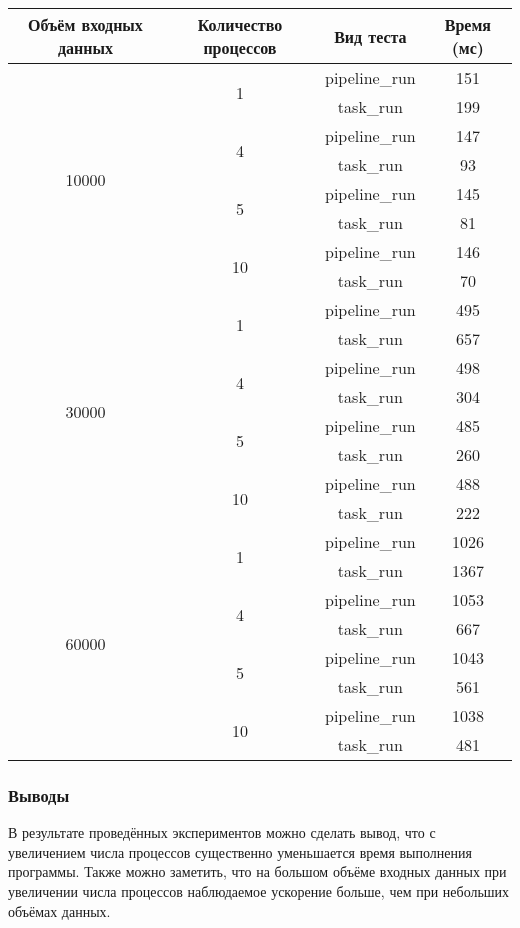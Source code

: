 \documentclass[a4paper,12pt]{article}
\begin{document}
\begin{table}[h]

\begin{tabular}{|c|c|c|c|}
	\hline
	\textbf{Объём входных данных} & \textbf{Количество процессов} & \textbf{Вид теста} & \textbf{Время (мс)} \\
	\hline
	\multirow{8}{*}{10000} & \multirow{2}{*}{1} & pipeline\_run & 151 \\
	& & task\_run & 199 \\
	\cline{2-4}
	& \multirow{2}{*}{4} & pipeline\_run & 147 \\
	& & task\_run & 93  \\
	\cline{2-4}
	& \multirow{2}{*}{5} & pipeline\_run & 145 \\
	& & task\_run & 81 \\
	\cline{2-4}
	& \multirow{2}{*}{10} & pipeline\_run & 146 \\
	& & task\_run & 70  \\
	\hline
	\multirow{8}{*}{30000} & \multirow{2}{*}{1} & pipeline\_run & 495 \\
	& & task\_run & 657 \\
	\cline{2-4}
	& \multirow{2}{*}{4} & pipeline\_run & 498 \\
	& & task\_run & 304  \\
	\cline{2-4}
	& \multirow{2}{*}{5} & pipeline\_run & 485 \\
	& & task\_run & 260 \\
	\cline{2-4}
	& \multirow{2}{*}{10} & pipeline\_run & 488 \\
	& & task\_run & 222  \\
	\hline
	\multirow{8}{*}{60000} & \multirow{2}{*}{1} & pipeline\_run & 1026 \\
	& & task\_run & 1367 \\
	\cline{2-4}
	& \multirow{2}{*}{4} & pipeline\_run & 1053 \\
	& & task\_run & 667  \\
	\cline{2-4}
	& \multirow{2}{*}{5} & pipeline\_run & 1043 \\
	& & task\_run & 561 \\
	\cline{2-4}
	& \multirow{2}{*}{10} & pipeline\_run & 1038 \\
	& & task\_run & 481  \\
	\hline
\end{tabular}

\end{table}


\subsubsection*{Выводы}
\hspace*{15pt}В результате проведённых экспериментов можно сделать вывод, что с увеличением числа процессов существенно уменьшается время выполнения программы. Также можно заметить, что на большом объёме входных данных при увеличении числа процессов наблюдаемое ускорение больше, чем при небольших объёмах данных.
\end{document}
